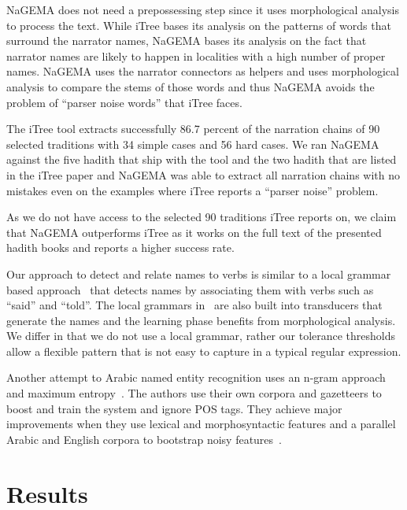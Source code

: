\documentclass[11pt]{article}
\begin{document}

NaGEMA does not need a prepossessing step since 
it uses morphological analysis to process the text. 
While iTree bases its analysis on the patterns 
of words that surround the narrator names, 
NaGEMA bases its analysis on the fact that narrator
names are likely to happen in localities with a high
number of proper names. 
NaGEMA uses the narrator connectors as helpers and
uses morphological analysis to compare the stems of
those words and thus NaGEMA avoids the problem of 
``parser noise words'' that iTree faces. 

The iTree tool extracts successfully 86.7 percent of
the narration chains of 90 selected traditions with 
34 simple cases and 56 hard cases. 
We ran NaGEMA against the five hadith that ship with
the tool and the two hadith that are listed in the iTree
paper and NaGEMA was able to extract all narration
chains with no mistakes even on the examples where iTree
reports a ``parser noise'' problem.

As we do not have access to the selected
90 traditions iTree reports on, we claim
that NaGEMA outperforms iTree as it works on
the full text of the presented hadith books
and reports a higher success rate. 

Our approach to detect and relate names to verbs
is similar to a local grammar based 
approach~\cite{Traboulsi:09} that detects names by
associating them with verbs 
such as  ``said'' and  ``told''. 
The local grammars in~\cite{Traboulsi:09} are also
built into transducers that generate the names and
the learning phase benefits from morphological analysis. 
We differ in that we do not use a local grammar, rather
our tolerance thresholds allow a flexible pattern that is
not easy to capture in a typical regular expression.

Another attempt to Arabic named entity recognition
uses an n-gram approach and maximum 
entropy~\cite{ANERSys:07}. 
The authors use their own corpora and gazetteers to boost 
and train the system and ignore POS tags. 
They achieve major improvements when they use lexical and
morphosyntactic features and a parallel Arabic and English 
corpora to bootstrap noisy features~\cite{Benajiba:2010}.

\section{Results}
\label{sec:results}
\end{document}
